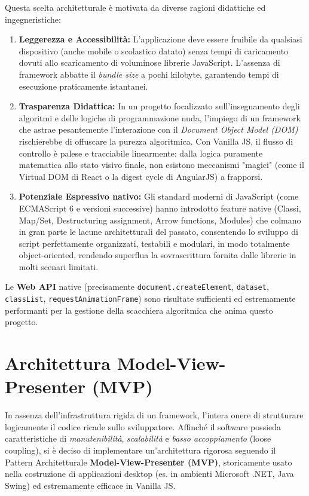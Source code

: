 \documentclass[openany]{theme/uniprthesis}
\begin{document}
Questa scelta architetturale è motivata da diverse ragioni didattiche ed ingegneristiche:
\begin{enumerate}
    \item \textbf{Leggerezza e Accessibilità:} L'applicazione deve essere fruibile da qualsiasi dispositivo (anche mobile o scolastico datato) senza tempi di caricamento dovuti allo scaricamento di voluminose librerie JavaScript. L'assenza di framework abbatte il \textit{bundle size} a pochi kilobyte, garantendo tempi di esecuzione praticamente istantanei.
    \item \textbf{Trasparenza Didattica:} In un progetto focalizzato sull'insegnamento degli algoritmi e delle logiche di programmazione nuda, l'impiego di un framework che astrae pesantemente l'interazione con il \textit{Document Object Model (DOM)} rischierebbe di offuscare la purezza algoritmica. Con Vanilla JS, il flusso di controllo è palese e tracciabile linearmente: dalla logica puramente matematica allo stato visivo finale, non esistono meccanismi "magici" (come il Virtual DOM di React o la digest cycle di AngularJS) a frapporsi.
    \item \textbf{Potenziale Espressivo nativo:} Gli standard moderni di JavaScript (come ECMAScript 6 e versioni successive) hanno introdotto feature native (Classi, Map/Set, Destructuring assignment, Arrow functions, Modules) che colmano in gran parte le lacune architetturali del passato, consentendo lo sviluppo di script perfettamente organizzati, testabili e modulari, in modo totalmente object-oriented, rendendo superflua la sovrascrittura fornita dalle librerie in molti scenari limitati.
\end{enumerate}

Le \textbf{Web API} native (precisamente \texttt{document.createElement}, \texttt{dataset}, \texttt{classList}, \texttt{requestAnimationFrame}) sono risultate sufficienti ed estremamente performanti per la gestione della scacchiera algoritmica che anima questo progetto.

\section{Architettura Model-View-Presenter (MVP)}
In assenza dell'infrastruttura rigida di un framework, l'intera onere di strutturare logicamente il codice ricade sullo sviluppatore. Affinché il software possieda caratteristiche di \textit{manutenibilità}, \textit{scalabilità} e \textit{basso accoppiamento} (loose coupling), si è deciso di implementare un'architettura rigorosa seguendo il Pattern Architetturale \textbf{Model-View-Presenter (MVP)}, storicamente usato nella costruzione di applicazioni desktop (es. in ambienti Microsoft .NET, Java Swing) ed estremamente efficace in Vanilla JS.
\end{document}
